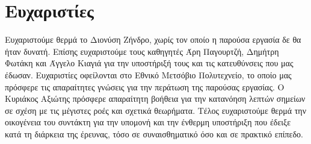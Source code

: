 \section{Ευχαριστίες}
  Ευχαριστούμε θερμά το Διονύση Ζήνδρο, χωρίς τον οποίο η παρούσα εργασία δε θα ήταν δυνατή. Επίσης ευχαριστούμε τους
  καθηγητές Άρη Παγουρτζή, Δημήτρη Φωτάκη και Άγγελο Κιαγιά για την υποστήριξή τους και τις κατευθύνσεις που μας έδωσαν.
  Ευχαριστίες οφείλονται στο Εθνικό Μετσόβιο Πολυτεχνείο, το οποίο μας πρόσφερε τις απαραίτητες γνώσεις για την περάτωση της
  παρούσας εργασίας. Ο Κυριάκος Αξιώτης πρόσφερε απαραίτητη βοήθεια για την κατανόηση λεπτών σημείων σε σχέση με τις μέγιστες
  ροές και σχετικά θεωρήματα. Τέλος ευχαριστούμε θερμά την οικογένεια του συντάκτη για την υπομονή και την ένθερμη υποστήριξη
  που έδειξε κατά τη διάρκεια της έρευνας, τόσο σε συναισθηματικό όσο και σε πρακτικό επίπεδο.
